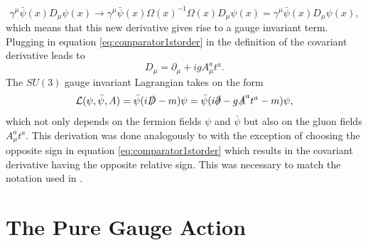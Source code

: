 \begin{equation}
    \gamma^\mu \bar\psi(x) D_\mu\psi(x)\rightarrow\gamma^\mu \bar\psi(x)\Omega(x)^{-1} \Omega(x)D_\mu\psi(x)=\gamma^\mu \bar\psi(x) D_\mu\psi(x),
\end{equation}
which means that this new derivative gives rise to a gauge invariant term.
Plugging in equation \eqref{eq:comparator1storder} in the definition of the covariant derivative leads to 
\begin{equation}
    D_\mu = \partial_\mu+igA_\mu^at^a.
\end{equation}
The $SU(3)$ gauge invariant Lagrangian takes on the form 
\begin{equation}
    \mathcal L(\psi, \bar\psi, A)=\bar\psi (i\slashed D-m)\psi=\bar\psi (i\slashed \partial -g\slashed A^a t^a-m)\psi,
\end{equation}
which not only depends on the fermion fields $\psi$ and $\bar \psi$ but also on the gluon fields $A_\mu^at^a$. This derivation was done analogously to \cite{peskin} with the exception of choosing the opposite sign in equation \eqref{eq:comparator1storder} which results in the covariant derivative having the opposite relative sign. This was necessary to match the notation used in \cite{gattringer}. 











\section{The Pure Gauge Action}

